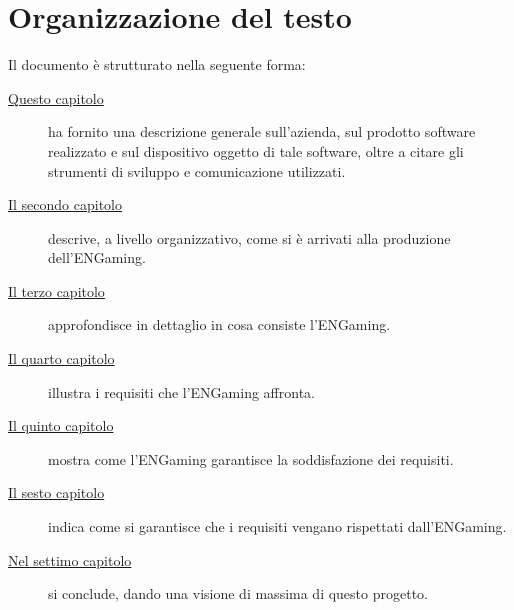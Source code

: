 \section{Organizzazione del testo}
Il documento è strutturato nella seguente forma:
\begin{description}
    \item[{\hyperref[cap:introduzione]{Questo capitolo}}] ha fornito una descrizione generale sull'azienda, sul prodotto software realizzato e sul dispositivo oggetto di tale software, oltre a citare gli strumenti di sviluppo e comunicazione utilizzati.
    
    \item[{\hyperref[cap:processi-metodologie]{Il secondo capitolo}}] descrive, a livello organizzativo, come si è arrivati alla produzione dell'ENGaming.
    
    \item[{\hyperref[cap:descrizione-stage]{Il terzo capitolo}}] approfondisce in dettaglio in cosa consiste l'ENGaming.
    
    \item[{\hyperref[cap:analisi-requisiti]{Il quarto capitolo}}] illustra i requisiti che l'ENGaming affronta.
    
    \item[{\hyperref[cap:progettazione-codifica]{Il quinto capitolo}}] mostra come l'ENGaming garantisce la soddisfazione dei requisiti.
    
    \item[{\hyperref[cap:verifica-validazione]{Il sesto capitolo}}] indica come si garantisce che i requisiti vengano rispettati dall'ENGaming.
    
    \item[{\hyperref[cap:conclusioni]{Nel settimo capitolo}}] si conclude, dando una visione di massima di questo progetto.
\end{description}

